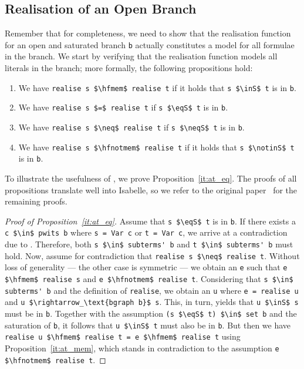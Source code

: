 \documentclass[runningheads]{llncs}
\newcommand{\inS}{\in_\text{s}}
\newcommand{\notinS}{\notin_\text{s}}
\newcommand{\eqS}{=_\text{s}}
\newcommand{\neqS}{\neq_\text{s}}
\newcommand{\hfmem}{\boldsymbol{\in}}
\newcommand{\hfnotmem}{\boldsymbol{\notin}}
\begin{document}
\subsection{Realisation of an Open Branch\label{sec:real}}
Remember that for completeness, we need to show that the realisation function for an open and saturated branch \lstinline!b! actually constitutes a model for all formulae in the branch.
We start by verifying that the realisation function models all literals in the branch; more formally, the following propositions hold:
\begin{enumerate}[label={(\arabic*)}]
  \item\label{it:at_mem} We have \lstinline!realise s $\hfmem$ realise t! if it holds that \lstinline!s $\inS$ t! is in \lstinline!b!. 
  \item\label{it:at_eq} We have \lstinline!realise s $=$ realise t! if \lstinline!s $\eqS$ t! is in \lstinline!b!.
  \item\label{it:af_eq} We have \lstinline!realise s $\neq$ realise t! if \lstinline!s $\neqS$ t! is in \lstinline!b!.
  \item\label{it:af_mem} We have \lstinline!realise s $\hfnotmem$ realise t! if it holds that \lstinline!s $\notinS$ t! is in \lstinline!b!. 
\end{enumerate}
To illustrate the usefulness of , we prove Proposition~\ref{it:at_eq}.
The proofs of all propositions translate well into Isabelle, so we refer to the original paper~\cite{new_fast_tableau} for the remaining proofs. 
\begin{proof}[Proof of Proposition~\ref{it:at_eq}]
  Assume that \lstinline!s $\eqS$ t! is in \lstinline!b!.
  If there exists a \lstinline!c $\in$ pwits b! where \lstinline!s = Var c! or \lstinline!t = Var c!, we arrive at a contradiction due to .
  Therefore, both \lstinline!s $\in$ subterms' b! and \lstinline!t $\in$ subterms' b! must hold.
  Now, assume for contradiction that \lstinline!realise s $\neq$ realise t!.
  Without loss of generality --- the other case is symmetric --- we obtain an \lstinline!e! such that
  \lstinline!e $\hfmem$ realise s! and \lstinline!e $\hfnotmem$ realise t!. 
  Considering that \lstinline!s $\in$ subterms' b! and the definition of \lstinline!realise!, we obtain an \lstinline!u! where \lstinline!e = realise u! and \lstinline!u $\rightarrow_\text{bgraph b}$ s!.
  This, in turn, yields that \lstinline!u $\inS$ s! must be in \lstinline!b!.
  Together with the assumption \lstinline!(s $\eqS$ t) $\in$ set b! and the saturation of \lstinline!b!, it follows that \lstinline!u $\inS$ t! must also be in \lstinline!b!.
  But then we have
  \lstinline!realise u $\hfmem$ realise t = e $\hfmem$ realise t!
  using Proposition~\ref{it:at_mem}, which stands in contradiction to the assumption \lstinline!e $\hfnotmem$ realise t!.
\end{proof}
\end{document}
